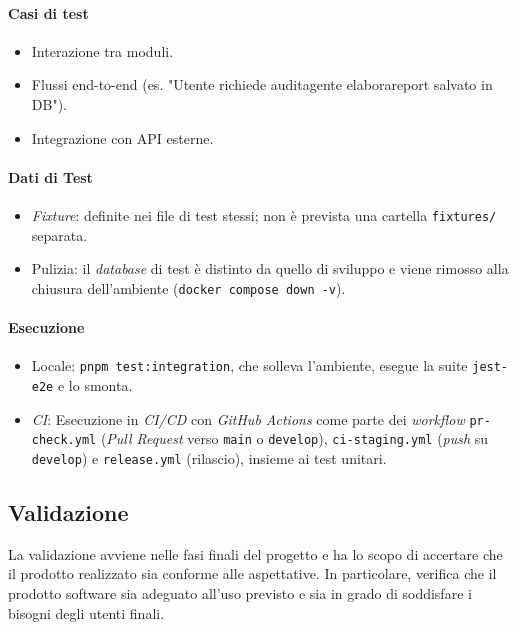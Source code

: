 \documentclass[12pt, a4paper]{article}
\begin{document}
\paragraph{Casi di test}
\begin{itemize}
    \item Interazione tra moduli.
    \item Flussi end-to-end (es. "Utente richiede audit\textrightarrow agente elabora\textrightarrow report salvato in DB").
    \item Integrazione con API esterne.
\end{itemize}

\paragraph{Dati di Test}
\begin{itemize}
    \item \textit{Fixture}: definite nei file di test stessi; non è prevista una cartella \texttt{fixtures/} separata.
    \item Pulizia: il \textit{database} di test è distinto da quello di sviluppo e viene rimosso alla chiusura dell'ambiente (\texttt{docker compose down -v}).
\end{itemize}

\paragraph{Esecuzione}
\begin{itemize}
    \item Locale: \texttt{pnpm test:integration}, che solleva l'ambiente, esegue la suite \texttt{jest-e2e} e lo smonta.
    \item \textit{CI}: Esecuzione in \textit{CI/CD} con \textit{GitHub Actions} come parte dei \textit{workflow} \texttt{pr-check.yml} (\textit{Pull Request} verso \texttt{main} o \texttt{develop}), \texttt{ci-staging.yml} (\textit{push} su \texttt{develop}) e \texttt{release.yml} (rilascio), insieme ai test unitari.
\end{itemize}

\newpage
\subsection{Validazione}

La validazione avviene nelle fasi finali del progetto e ha lo scopo di accertare che il prodotto realizzato sia conforme alle aspettative. In particolare, verifica che il prodotto software sia adeguato all'uso previsto e sia in grado di soddisfare i bisogni degli utenti finali.
\end{document}
